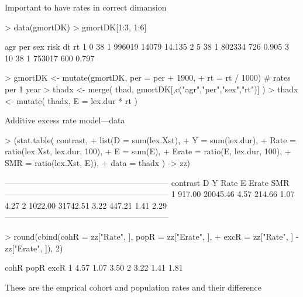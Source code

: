 \begin{frame}[fragile]{Important to have rates in correct dimansion}
\begin{Schunk}
\begin{Sinput}
> data(gmortDK)
> gmortDK[1:3, 1:6]
\end{Sinput}
\begin{Soutput}
  agr per sex   risk    dt     rt
1   0  38   1 996019 14079 14.135
2   5  38   1 802334   726  0.905
3  10  38   1 753017   600  0.797
\end{Soutput}
\begin{Sinput}
> gmortDK <- mutate(gmortDK, per = per + 1900,
+                             rt = rt / 1000) # rates per 1 year
> thadx <- merge( thad, gmortDK[,c("agr","per","sex","rt")] )
> thadx <- mutate( thadx, E = lex.dur * rt )
\end{Sinput}
\end{Schunk}
\end{frame}

\begin{frame}[fragile]{Additive excess rate model---data}
\begin{Schunk}
\begin{Sinput}
> (stat.table( contrast,
+             list(D = sum(lex.Xst),
+                  Y = sum(lex.dur),
+               Rate = ratio(lex.Xst, lex.dur, 100),
+                  E = sum(E),
+              Erate = ratio(E, lex.dur, 100),
+                SMR = ratio(lex.Xst, E)),
+             data = thadx ) -> zz)
\end{Sinput}
\begin{Soutput}
 ------------------------------------------------------------ 
 contrast         D        Y    Rate       E   Erate     SMR  
 ------------------------------------------------------------ 
 1           917.00 20045.46    4.57  214.66    1.07    4.27  
 2          1022.00 31742.51    3.22  447.21    1.41    2.29  
 ------------------------------------------------------------ 
\end{Soutput}
\begin{Sinput}
> round(cbind(cohR = zz["Rate", ], popR = zz["Erate", ],
+             excR = zz["Rate", ] - zz["Erate", ]), 2)
\end{Sinput}
\begin{Soutput}
  cohR popR excR
1 4.57 1.07 3.50
2 3.22 1.41 1.81
\end{Soutput}
\end{Schunk}
These are the emprical cohort and population rates and their difference
\end{frame}

